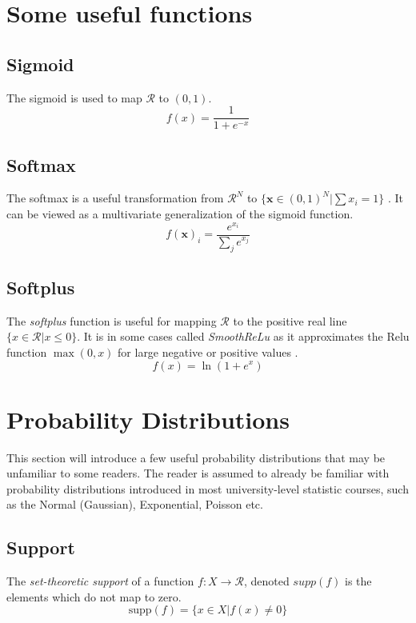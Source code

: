 

\section{Some useful functions}
\subsection{Sigmoid}
The sigmoid is used to map $\mathcal{R}$ to $(0, 1)$.
\begin{equation}\label{eq:sigmoid}
    f(x) = \frac{1}{1 + e^{-x}}
\end{equation}

\subsection{Softmax}
The softmax is a useful transformation from $\mathcal{R}^N$ to $\{\mathbf{x} \in (0,1)^N | \sum x_i = 1\}$ \cite{murphy,tensorflow2015-whitepaper}. It can be viewed as a multivariate generalization of the sigmoid function. 
\begin{equation}\label{eq:softmax}
    f(\mathbf{x})_i = \frac{e^{x_i}}{\sum_j e^{x_j}}
\end{equation}

\subsection{Softplus}
The \textit{softplus} function is useful for mapping $\mathcal{R}$ to the positive real line $\{x \in \mathcal{R} | x \leq 0\}$. It is in some cases called \textit{SmoothReLu} as it approximates the Relu function $\max(0, x)$ for large negative or positive values \cite{tensorflow2015-whitepaper}.
\begin{equation}\label{eq:softplus}
    f(x) = \ln (1 + e^x)
\end{equation}


\section{Probability Distributions}

This section will introduce a few useful probability distributions that may be unfamiliar to some readers. The reader is assumed to already be familiar with probability distributions introduced in most university-level statistic courses, such as the Normal (Gaussian), Exponential, Poisson etc. 

\subsection{Support}
The \textit{set-theoretic support} of a function $f: X \to \mathcal{R}$, denoted $supp(f)$ is the elements which do not map to zero.
\begin{equation}
    \text{supp}(f) = \{x \in X | f(x) \neq 0\}
\end{equation}

